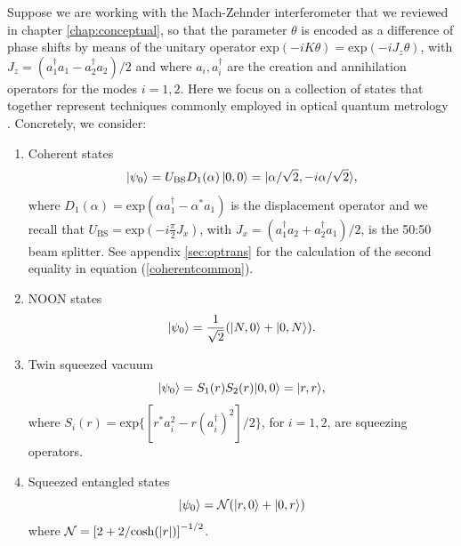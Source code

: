 Suppose we are working with the Mach-Zehnder interferometer that we reviewed in chapter \ref{chap:conceptual}, so that the parameter $\theta$ is encoded as a difference of phase shifts by means of the unitary operator $\mathrm{exp}(-i K\theta) = \mathrm{exp}(-i J_z\theta)$, with $J_z = (a_1^{\dagger}a_1 - a_2^{\dagger}a_2)/2$ and where $a_i,a_i^{\dagger}$ are the creation and annihilation operators for the modes $i = 1,2$. Here we focus on a collection of states that together represent techniques commonly employed in optical quantum metrology \cite{rafal2015, sahota2015, PaulProctor2016, jarzyna2012}. Concretely, we consider:
\begin{enumerate}
\item Coherent states 
\begin{equation}
\ket{\psi_0} = U_{\mathrm{BS}} D_1(\alpha) \ket{0, 0} = |\alpha/\sqrt{2},-i\alpha/\sqrt{2}\rangle,
\label{coherentcommon}
\end{equation}
where $D_1(\alpha) = \mathrm{exp}(\alpha a_1^{\dagger} - \alpha^{*}a_1)$ is the displacement operator and we recall that $U_{\mathrm{BS}} = \mathrm{exp}(-i\frac{\pi}{2}J_x)$, with $J_x = (a_1^{\dagger}a_2 + a_2^{\dagger}a_1)/2$, is the 50:50 beam splitter. See appendix \ref{sec:optrans} for the calculation of the second equality in equation (\ref{coherentcommon}).  
\item NOON states
\begin{equation}
\ket{\psi_0} = \frac{1}{\sqrt{2}}(|N, 0\rangle + |0, N\rangle).
\label{noon}
\end{equation}
\item Twin squeezed vacuum 
\begin{equation}
\ket{\psi_0} = S_1(r) S_2(r)|0, 0\rangle = |r,r\rangle,
\end{equation}
where $S_i(r) = \mathrm{exp}\{[r^{*}a_i^2 - r (a_i^{\dagger})^2]/2\}$, for $i = 1, 2$, are squeezing operators. 
\item Squeezed entangled states 
\begin{equation}
\ket{\psi_0} = \mathcal{N} (|r,0\rangle +|0,r\rangle)
\end{equation}
where $\mathcal{N} = \left[2 + 2/\mathrm{cosh}(\abs{r})\right]^{-1/2}$.
\end{enumerate}

